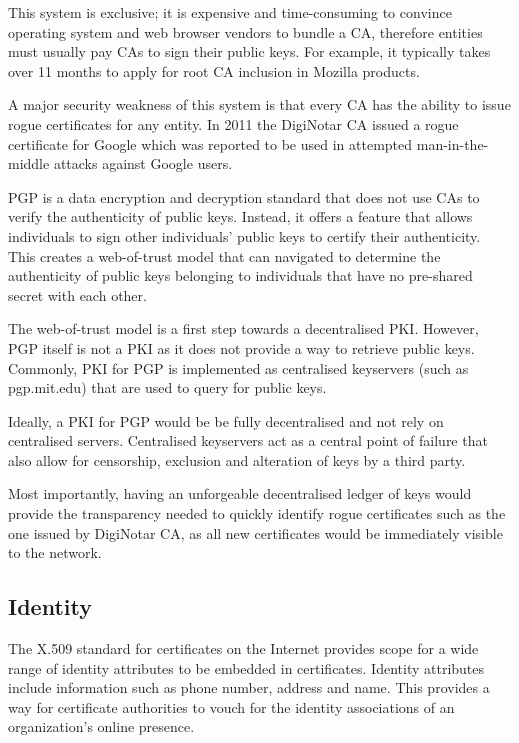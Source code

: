 \documentclass[12pt]{report}
\begin{document}
	This system is exclusive; it is expensive and time-consuming to convince operating system and web browser vendors to bundle a CA, therefore entities must usually pay CAs to sign their public keys. For example, it typically takes over 11 months to apply for root CA inclusion in Mozilla products\cite{6}.
	 
	A major security weakness of this system is that every CA has the ability to issue rogue certificates for any entity. In 2011 the DigiNotar CA issued a rogue certificate for Google which was reported to be used in attempted man-in-the-middle attacks against Google users\cite{7}.

	PGP is a data encryption and decryption standard that does not use CAs to verify the authenticity of public keys. Instead, it offers a feature that allows individuals to sign other individuals' public keys to certify their authenticity. This creates a web-of-trust model that can navigated to determine the authenticity of public keys belonging to individuals that have no pre-shared secret with each other.\cite{2}

	The web-of-trust model is a first step towards a decentralised PKI. However, PGP itself is not a PKI as it does not provide a way to retrieve public keys. Commonly, PKI for PGP is implemented as centralised keyservers (such as pgp.mit.edu) that are used to query for public keys.

	Ideally, a PKI for PGP would be be fully decentralised and not rely on centralised servers. Centralised keyservers act as a central point of failure that also allow for censorship, exclusion and alteration of keys by a third party.
	
	Most importantly, having an unforgeable decentralised ledger of keys would provide the transparency needed to quickly identify rogue certificates such as the one issued by DigiNotar CA, as all new certificates would be immediately visible to the network.
	
	\subsection{Identity}
	The X.509 standard for certificates on the Internet provides scope for a wide range of identity attributes to be embedded in certificates.\cite{8} Identity attributes include information such as phone number, address and name. This provides a way for certificate authorities to vouch for the identity associations of an organization's online presence.
	
\end{document}

